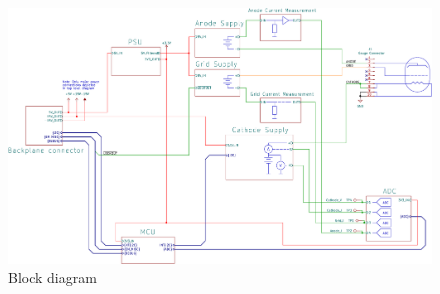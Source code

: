 \documentclass{article}
\begin{document}
\begin{landscape}
	\begin{figure}
		\begin{center}
			\includegraphics[width=1.5\textwidth]{figures/block_diagram.pdf}
		\end{center}
		\caption{Block diagram}\label{fig:block_diagram}
	\end{figure}
\end{landscape}
\end{document}
